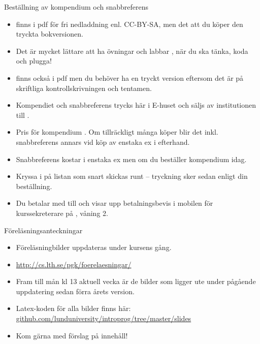\else


\begin{Slide}{Beställning av kompendium och snabbreferens}\SlideFontSmall
\begin{itemize}

\item {} finns i pdf för fri nedladdning enl. CC-BY-SA, men det  att du köper den tryckta bokversionen.

\item Det är mycket lättare att ha övningar och labbar  , när du ska tänka, koda och plugga!

\item {} finns också i pdf men du behöver ha en tryckt version eftersom det är  på skriftliga kontrollskrivningen och tentamen.

\item Kompendiet och snabbreferens trycks här i E-huset och säljs av institutionen till .

\item Pris för kompendium . Om tillräckligt många köper blir det  inkl. snabbreferens annars  vid köp av enstaka ex i efterhand.

\item Snabbreferens kostar  i enstaka ex men  om du beställer kompendium idag.

\item Kryssa i  på listan som snart skickas runt -- tryckning sker sedan enligt din beställning.

\item Du betalar med  till  och visar upp betalningsbevis i mobilen för kurssekreterare på , våning 2.

\end{itemize}
\end{Slide}

\begin{Slide}{Föreläsningsanteckningar}
\begin{itemize}
\item Föreläsningbilder uppdateras under kursens gång.
\item \url{http://cs.lth.se/pgk/foerelaesningar/}
\item Fram till mån kl 13 aktuell vecka är de bilder som ligger ute under pågående uppdatering sedan förra årets version.
\item Latex-koden för alla bilder finns här: \\
\href{https://github.com/lunduniversity/introprog/tree/master/slides}{github.com/lunduniversity/introprog/tree/master/slides}
\item Kom gärna med förslag på innehåll!
\end{itemize}
\end{Slide}
\fi

